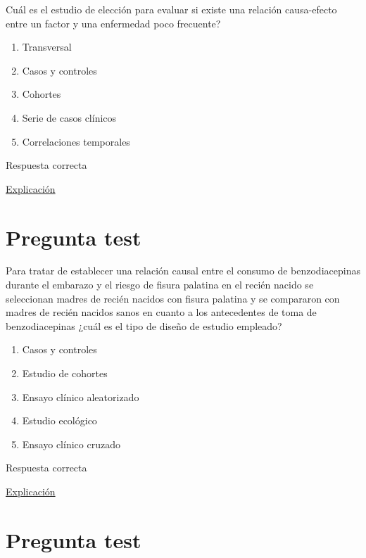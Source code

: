\documentclass[
]{book}
\providecommand{\tightlist}{%
  \setlength{\itemsep}{0pt}\setlength{\parskip}{0pt}}
\begin{document}
Cuál es el estudio de elección para evaluar si existe una relación causa-efecto entre un factor y una enfermedad poco frecuente?

\begin{enumerate}
\def\labelenumi{\alph{enumi})}
\tightlist
\item
  Transversal
\item
  Casos y controles
\item
  Cohortes
\item
  Serie de casos clínicos
\item
  Correlaciones temporales
\end{enumerate}

Respuesta correcta

\href{http://www.scielo.org.pe/scielo.php?script=sci_arttext\&pid=S2308-05312020000100138}{Explicación}

\hypertarget{pregunta-test-45}{%
\section{Pregunta test}\label{pregunta-test-45}}

Para tratar de establecer una relación causal entre el consumo de benzodiacepinas durante el embarazo y el riesgo de fisura palatina en el recién nacido se seleccionan madres de recién nacidos con fisura palatina y se compararon con madres de recién nacidos sanos en cuanto a los antecedentes de toma de benzodiacepinas ¿cuál es el tipo de diseño de estudio empleado?

\begin{enumerate}
\def\labelenumi{\alph{enumi})}
\tightlist
\item
  Casos y controles
\item
  Estudio de cohortes
\item
  Ensayo clínico aleatorizado
\item
  Estudio ecológico
\item
  Ensayo clínico cruzado
\end{enumerate}

Respuesta correcta

\href{http://www.scielo.org.pe/scielo.php?script=sci_arttext\&pid=S2308-05312020000100138}{Explicación}

\hypertarget{pregunta-test-46}{%
\section{Pregunta test}\label{pregunta-test-46}}
\end{document}
